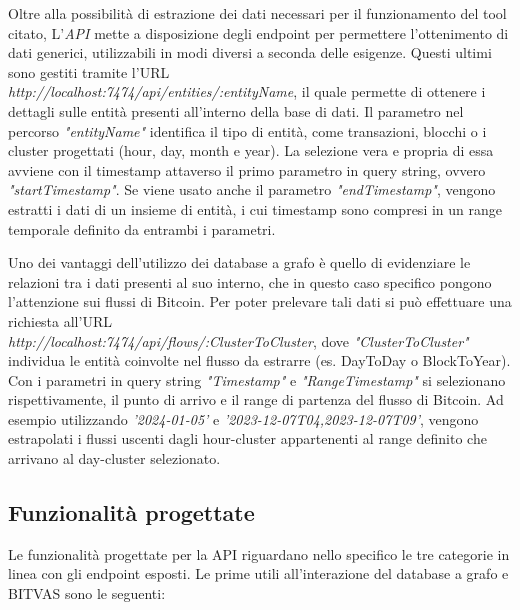 Oltre alla possibilità di estrazione dei dati necessari per il funzionamento del tool citato, L'\textit{API} mette a disposizione degli endpoint per permettere l'ottenimento di dati generici, utilizzabili in modi diversi a seconda delle esigenze.
Questi ultimi sono gestiti tramite l'URL  \\
\emph{http://localhost:7474/api/entities/:entityName}, il quale permette di ottenere i dettagli sulle entità presenti all'interno della base di dati.
Il parametro nel percorso \emph{"entityName"} identifica il tipo di entità, come transazioni, blocchi o i cluster progettati (hour, day, month e year). La selezione vera e propria di essa avviene con il timestamp attaverso il primo parametro in query string, ovvero \emph{"startTimestamp"}.
Se viene usato anche il parametro \emph{"endTimestamp"}, vengono estratti i dati di un insieme di entità, i cui timestamp sono compresi in un range temporale definito da entrambi i parametri.

Uno dei vantaggi dell'utilizzo dei database a grafo è quello di evidenziare le relazioni tra i dati presenti al suo interno, che in questo caso specifico pongono l'attenzione sui flussi di Bitcoin.
Per poter prelevare tali dati si può effettuare una richiesta all'URL 
 \\
 \emph{http://localhost:7474/api/flows/:ClusterToCluster}, dove \emph{"ClusterToCluster"} individua le entità coinvolte nel flusso da estrarre (es. DayToDay o BlockToYear). Con i parametri in query string \emph{"Timestamp"} e \emph{"RangeTimestamp"} si selezionano rispettivamente, il punto di arrivo e il range di partenza del flusso di Bitcoin.
Ad esempio utilizzando \textit{'2024-01-05'} e \textit{'2023-12-07T04,2023-12-07T09'}, vengono estrapolati i flussi uscenti dagli hour-cluster appartenenti al range definito che arrivano al day-cluster selezionato.

\subsection{Funzionalità progettate}
Le funzionalità progettate per la API riguardano nello specifico le tre categorie in linea con gli endpoint esposti.
Le prime utili all'interazione del database a grafo e BITVAS sono le seguenti:

